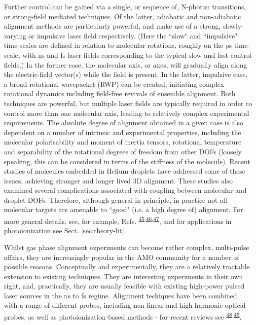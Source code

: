 \documentclass[10pt]{article}
\begin{document}
Further control can be gained via a single, or sequence of, N-photon transitions, or strong-field mediated techniques. Of the latter, adiabatic and non-adiabatic alignment methods are particularly powerful, and make use of a strong, slowly-varying or impulsive laser field respectively. (Here the ``slow" and ``impulsive" time-scales are defined in relation to molecular rotations, roughly on the ps time-scale, with ns and fs laser fields corresponding to the typical slow and fast control fields.) In the former case, the molecular axis, or axes, will gradually align along the electric-field vector(s) while the field is present. In the latter, impulsive case, a broad rotational wavepacket (RWP) can be created, initiating complex rotational dynamics including field-free revivals of ensemble alignment. Both techniques are powerful, but multiple laser fields are typically required in order to control more than one molecular axis, leading to relatively complex experimental requirements. The absolute degree of alignment obtained in a given case is also dependent on a number of intrinsic and experimental properties, including the molecular polarisability 
and moment of inertia tensors, rotational temperature and separability of the rotational degrees of freedom from other DOFs (loosely speaking, this can be considered in terms of the stiffness of the molecule). Recent studies of molecules embedded in Helium droplets have addressed some of these issues, achieving stronger and longer lived 3D alignment. These studies also examined several complications associated with coupling between molecular and droplet DOFs.   Therefore, although general in principle, in practice not all molecular targets are amenable to ``good" (i.e. a high degree of) alignment. For more general details, see, for example, Refs. \textsuperscript{\hyperref[csl:45]{45},\hyperref[csl:46]{46},\hyperref[csl:47]{47}}, and for applications in photoionization see Sect. \ref{sec:theory-lit}.

Whilst gas phase alignment experiments can become rather complex, multi-pulse affairs, they are increasingly popular in the AMO community for a number of possible reasons. Conceptually and experimentally, they are a relatively tractable extension to existing techniques. They are interesting experiments in their own right, and, practically, they are usually feasible with existing high-power pulsed laser sources in the ns to fs regime. Alignment techiques have been combined with a range of different probes, including non-linear and high-harmonic optical probes, as well as photoionization-based methods - for recent reviews see \textsuperscript{\hyperref[csl:48]{48},\hyperref[csl:45]{45}}. 
\end{document}
